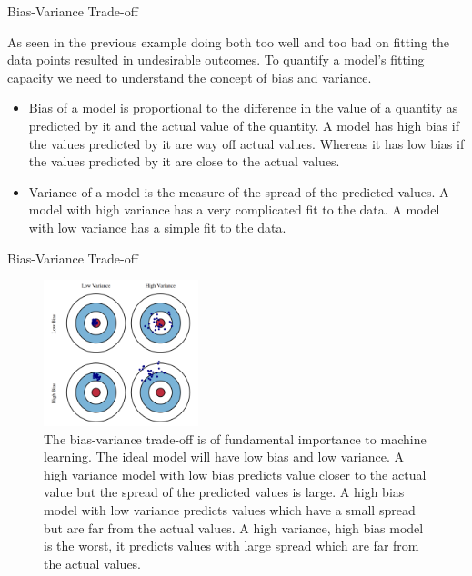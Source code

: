 \documentclass[11pt,notheorems,hyperref={pdfauthor=whatever}]{beamer}
\begin{document}
\begin{frame}{Bias-Variance Trade-off}

As seen in the previous example doing both too well and too bad on fitting the data points resulted in undesirable outcomes. To quantify a model's fitting capacity we need to understand the concept of bias and variance.
\begin{itemize}
    \item \alert{Bias} of a model is proportional to the difference in the value of a quantity as predicted by it and the actual value of the quantity. A model has high bias if the values predicted by it are way off actual values. Whereas it has low bias if the values predicted by it are close to the actual values.
    \item \alert{Variance} of a model is the measure of the spread of the predicted values. A model with high variance has a very complicated fit to the data. A model with low variance has a simple fit to the data. 
\end{itemize}
\end{frame}

\begin{frame}{Bias-Variance Trade-off}
\begin{figure}
    \centering
    \includegraphics[width=0.4\textwidth]{figures/tradeoff.png}
    \caption{The bias-variance trade-off is of fundamental importance to machine learning. The ideal model will have low bias and low variance. A high variance model with low bias predicts value closer to the actual value but the spread of the predicted values is large. A high bias model with low variance predicts values which have a small spread but are far from the actual values. A high variance, high bias model is the worst, it predicts values with large spread which are far from the actual values.}
    \label{fig:tradeoff}
\end{figure}
\end{frame}
\end{document}
